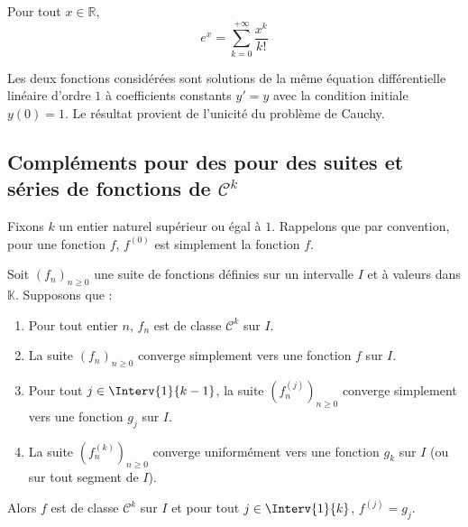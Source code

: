 \documentclass[a4paper,10pt]{report}
\begin{document}
\vspace{9cm}

\begin{Corollaire}{} Pour tout $x \in \mathbb{R}$, 
$$ e^x = \sum_{k=0}^{+ \infty} \frac{x^k}{k!}$$
\end{Corollaire}

\begin{Demonstration}{} Les deux fonctions considérées sont solutions de la même équation différentielle linéaire d'ordre $1$ à coefficients constants $y'=y$ avec la condition initiale $y(0)=1$. Le résultat provient de l'unicité du problème de Cauchy.
\end{Demonstration}

\subsection{Compléments pour des pour des suites et séries de fonctions de $\mathcal{C}^k$}

Fixons $k$ un entier naturel supérieur ou égal à $1$. Rappelons que par convention, pour une fonction $f$, $f^{(0)}$ est simplement la fonction $f$.

\medskip

\begin{Theoreme}{} Soit $(f_n)_{n \geq 0}$ une suite de fonctions définies sur un intervalle $I$ et à valeurs dans $\mathbb{K}$. Supposons que :

\begin{enumerate}
\item Pour tout entier $n$, $f_n$ est de classe $\mathcal{C}^k$ sur $I$.
\item La suite $(f_n)_{n \geq 0}$ converge simplement vers une fonction $f$ sur $I$.
\item Pour tout $j \in \Interv{1}{k-1}$, la suite $(f_n^{(j)})_{n \geq 0}$ converge simplement vers une fonction $g_j$ sur $I$.
\item La suite $(f_n^{(k)})_{n \geq 0}$ converge uniformément vers une fonction $g_k$ sur $I$ (ou sur tout segment de $I$).
\end{enumerate}
Alors $f$ est de classe $\mathcal{C}^k$ sur $I$ et pour tout $j \in \Interv{1}{k}$, $f^{(j)} = g_j$.
\end{Theoreme}
\end{document}
